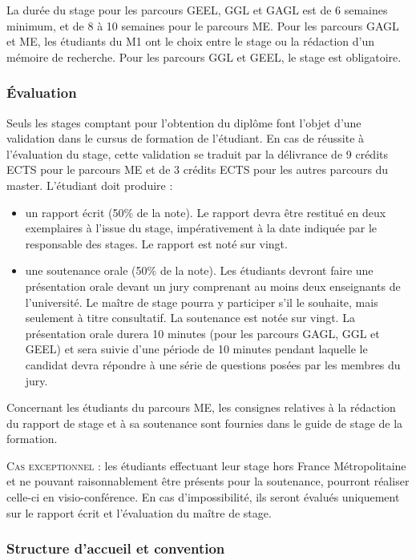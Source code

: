 \documentclass[a4paper,11pt]{article}
\begin{document}
La durée du stage pour les parcours GEEL, GGL et GAGL est de 6 semaines minimum, et de 8 à 10 semaines pour le parcours ME. Pour les parcours GAGL et ME, les étudiants du M1 ont le choix entre le stage ou la rédaction d'un mémoire de recherche. Pour les parcours GGL et GEEL, le stage est obligatoire. 

\subsubsection{Évaluation}
Seuls les stages comptant pour l'obtention du diplôme font l'objet d'une validation dans le cursus de formation de l'étudiant. En cas de réussite à l'évaluation du stage, cette validation se traduit par la délivrance de 9 crédits ECTS pour le parcours ME et de 3 crédits ECTS pour les autres parcours du master. L'étudiant doit produire :
\begin{itemize}
	\item un rapport écrit (50\% de la note). Le rapport devra être restitué en deux exemplaires à l'issue du stage, impérativement à la date indiquée par le responsable des stages. Le rapport est noté sur vingt.
	\item une soutenance orale (50\% de la note). Les étudiants devront faire une présentation orale devant un jury comprenant au moins deux enseignants de l'université. Le maître de stage pourra y participer s'il le souhaite, mais seulement à titre consultatif. La soutenance est notée sur vingt. La présentation orale durera 10 minutes (pour les parcours GAGL, GGL et GEEL) et sera suivie d'une période de 10 minutes pendant laquelle le candidat devra répondre à une série de questions posées par les membres du jury.
\end{itemize}

Concernant les étudiants du parcours ME, les consignes relatives à la rédaction du rapport de stage et à sa soutenance sont fournies dans le guide de stage de la formation.

\textsc{Cas exceptionnel} : les étudiants effectuant leur stage hors France Métropolitaine et ne pouvant raisonnablement être présents pour la soutenance, pourront réaliser celle-ci en visio-conférence. En cas d'impossibilité, ils seront évalués uniquement sur le rapport écrit et l'évaluation du maître de stage.

\subsubsection{Structure d'accueil et convention}
\end{document}
